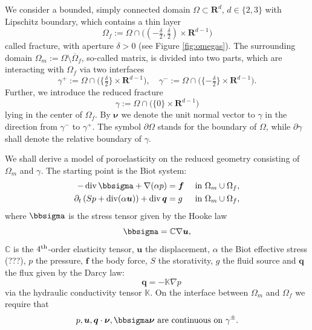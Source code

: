 \documentclass[a4paper]{article}
\def\div{\operatorname{div}}
\def\ff{\vc f}
\def\nnu{\vc\nu}
\def\prtl{\partial}
\def\qq{\vc q}
\def\Real{{\mathbf R}}
\def\tn#1{{\mathbb{#1}}}    %
\def\uu{\vc u}
\def\vc#1{\mathbf{\boldsymbol{#1}}}     %
\newcommand{\eq}[1]{\begin{equation}#1\end{equation}}
\begin{document}
We consider a bounded, simply connected domain $\Omega \subset \Real^d$, $d\in\{2,3\}$ with Lipschitz boundary, which contains a thin layer
\eq{ \Omega_f := \Omega\cap \big((-\tfrac\delta2,\tfrac\delta2)\times\Real^{d-1}\big) }
called fracture, with aperture $\delta>0$ (see Figure \ref{fig:omegas}).
The surrounding domain $\Omega_m:=\Omega\setminus\overline\Omega_f$, so-called matrix, is divided into two parts, which are interacting with $\Omega_f$ via two interfaces
\eq{ \gamma^+:=\Omega\cap\big( \{\tfrac\delta2\}\times \Real^{d-1}\big), \quad \gamma^-:=\Omega\cap\big( \{ -\tfrac\delta2\}\times \Real^{d-1}\big). }
Further, we introduce the reduced fracture
\eq{ \gamma:=\Omega\cap\big(\{0\}\times\Real^{d-1}\big) }
lying in the center of $\Omega_f$.
By $\nnu$ we denote the unit normal vector to $\gamma$ in the direction from $\gamma^-$ to $\gamma^+$.
The symbol $\prtl\Omega$ stands for the boundary of $\Omega$, while $\prtl\gamma$ shall denote the relative boundary of $\gamma$.

We shall derive a model of poroelasticity on the reduced geometry consisting of $\Omega_m$ and $\gamma$.
The starting point is the Biot system:
\begin{subequations}
\label{eq:biot}
\begin{align}
    \label{eq:lin_el}
    -\div \bbsigma + \nabla(\alpha p) &= \ff &&\mbox{ in }\Omega_m\cup\Omega_f,\\
\label{eq:biot_darcy}    \prtl_t\left(Sp + \div(\alpha\uu)\right) + \div\qq &= g &&\mbox{ in }\Omega_m\cup\Omega_f,
\end{align}
\end{subequations}
where $\bbsigma$ is the stress tensor given by the Hooke law
\eq{ \bbsigma = \tn C\nabla\uu, }
$\tn C$ is the $4^{\rm th}$-order elasticity tensor, $\uu$ the displacement, $\alpha$ the Biot effective stress (???), $p$ the pressure, $\ff$ the body force, $S$ the storativity, $g$ the fluid source and $\qq$ the flux given by the Darcy law:
\[ \quad \qq = -\tn K\nabla p \]
via the hydraulic conductivity tensor $\tn K$.
On the interface between $\Omega_m$ and $\Omega_f$ we require that
\eq{ p,\uu,\qq\cdot\nnu,\bbsigma\nnu \mbox{ are continuous on } \gamma^\pm. }
\end{document}
